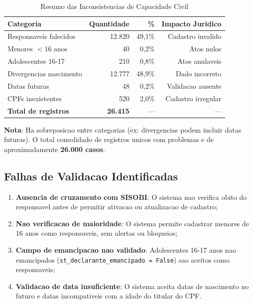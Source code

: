 \documentclass[11pt,a4paper]{article}
\begin{document}
\begin{table}[H]
\centering
\caption{Resumo das Inconsistencias de Capacidade Civil}
\label{tab:resumo}
\begin{tabular}{lrrr}
\toprule
\textbf{Categoria} & \textbf{Quantidade} & \textbf{\%} & \textbf{Impacto Juridico} \\
\midrule
Responsaveis falecidos & 12.820 & 49,1\% & Cadastro invalido \\
Menores $<$16 anos & 40 & 0,2\% & Atos nulos \\
Adolescentes 16-17 & 210 & 0,8\% & Atos anulaveis \\
Divergencias nascimento & 12.777 & 48,9\% & Dado incorreto \\
Datas futuras & 48 & 0,2\% & Validacao ausente \\
CPFs inexistentes & 520 & 2,0\% & Cadastro irregular \\
\midrule
\textbf{Total de registros} & \textbf{26.415} & --- & --- \\
\bottomrule
\end{tabular}
\end{table}

\textbf{Nota}: Ha sobreposicao entre categorias (ex: divergencias podem incluir datas futuras).
O total consolidado de registros unicos com problemas e de aproximadamente \textbf{26.000 casos}.

\subsection{Falhas de Validacao Identificadas}

\begin{enumerate}
    \item \textbf{Ausencia de cruzamento com SISOBI}: O sistema nao verifica obito do
    responsavel antes de permitir ativacao ou atualizacao de cadastro;

    \item \textbf{Nao verificacao de maioridade}: O sistema permite cadastrar menores de
    16 anos como responsaveis, sem alertas ou bloqueios;

    \item \textbf{Campo de emancipacao nao validado}: Adolescentes 16-17 anos nao emancipados
    (\texttt{st\_declarante\_emancipado = False}) sao aceitos como responsaveis;

    \item \textbf{Validacao de data insuficiente}: O sistema aceita datas de nascimento no
    futuro e datas incompativeis com a idade do titular do CPF.
\end{enumerate}
\end{document}
